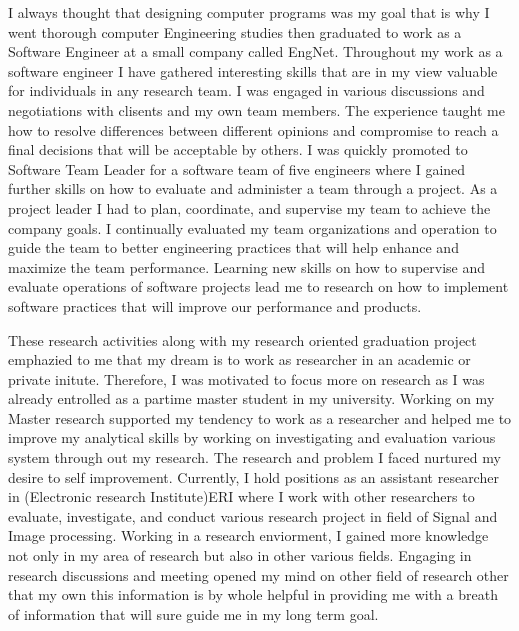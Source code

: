 \documentclass[a4paper,12pt]{article}%
\begin{document}
I always thought that designing computer programs was my goal that is why I went thorough computer Engineering studies then graduated to work as a Software Engineer at a small company called EngNet. Throughout my work as a software engineer I have gathered interesting skills that are in my view valuable for individuals in any research team.  I was engaged in various discussions and negotiations with clisents and my own team members. The experience taught me how to resolve differences between different opinions and compromise to reach a final decisions that will be acceptable by others. I was quickly promoted to Software Team Leader for a software team of five engineers  where I gained further skills on how to  evaluate and administer a team through a project. As a project leader I had to plan, coordinate, and  supervise my team to achieve the company goals. I continually evaluated my team organizations and operation to guide the team to better engineering practices that will help enhance and maximize the team performance.  Learning new skills on how to supervise and evaluate operations of software projects lead me to research on how to implement software practices that will improve our performance and products.  
 
 These research activities along with my research oriented graduation project emphazied to me that my dream is to work as researcher in an academic or private initute. Therefore, I was motivated to focus more on research as I was already entrolled as a partime master student in my  university. Working on my Master research supported my tendency to work as a researcher and helped me to improve my analytical skills by working on investigating and evaluation various system through out my research. The research and problem  I faced nurtured my desire to self improvement. Currently, I hold positions as an assistant researcher in (Electronic research Institute)ERI where I work with other researchers to evaluate, investigate, and conduct  various research project in field of Signal and Image processing. Working in a research enviorment, I gained more knowledge not only in my area of research but also in other various fields. Engaging in research discussions and meeting opened my mind  on other field of research other that my own this information is by whole helpful in providing me with  a breath of information that will sure guide me in my long term goal.  
 
\end{document}
